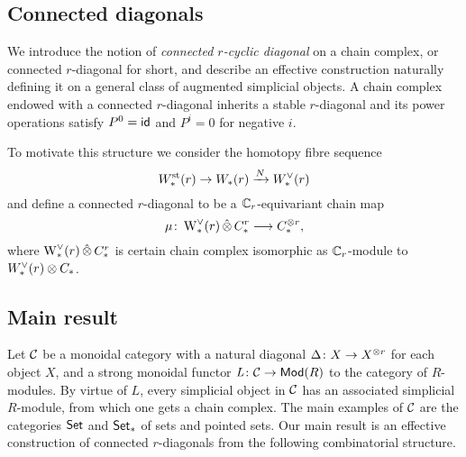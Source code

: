 \subsection{Connected diagonals}

We introduce the notion of \emph{connected $r$-cyclic diagonal} on a chain complex, or connected $r$-diagonal for short, and describe an effective construction naturally defining it on a general class of augmented simplicial objects.
A chain complex endowed with a connected $r$-diagonal inherits a stable $r$-diagonal and its power operations satisfy $P^0 = \mathsf{id}$ and $P^i = 0$ for negative $i$.

To motivate this structure we consider the homotopy fibre sequence
\[
W^{\mathrm{st}}_{*}(r) \to W_{*}(r) \xrightarrow{N} W^\vee_{*}(r)
\]
and define a connected $r$-diagonal to be a $\mathbb{C}_r$-equivariant chain map
\[
\mu \colon \operatorname{W}^\vee_{*}(r) \operatorname{\hat{\otimes}} C^{r}_{*} \longrightarrow C_{*}^{\otimes r},
\]
where $\operatorname{W}^\vee_{*}(r) \operatorname{\hat{\otimes}} C^{r}_{*}$ is certain chain complex isomorphic as $\mathbb{C}_r$-module to $W^\vee_{*}(r) \otimes C_{*}$.


\subsection{Main result}

Let $\mathcal{C}$ be a monoidal category with a natural diagonal $\Delta \colon X \to X^{\otimes r}$ for each object $X$, and a strong monoidal functor $\operatorname{{\it L}} \colon \mathcal{C} \to \mathsf{Mod}(R)$ to the category of $R$-modules.
By virtue of $L$, every simplicial object in $\mathcal{C}$ has an associated simplicial $R$-module, from which one gets a chain complex.
The main examples of $\mathcal{C}$ are the categories $\mathsf{Set}$ and $\mathsf{Set}_*$ of sets and pointed sets.
Our main result is an effective construction of connected $r$-diagonals from the following combinatorial structure.

